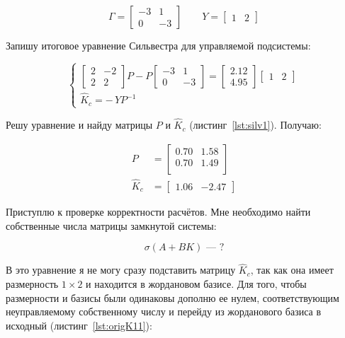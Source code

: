 \documentclass[a4paper,12pt]{article}
\begin{document}
	\[
	\Gamma =
	\begin{bmatrix}
		-3 & 1 \\
		0 & -3
	\end{bmatrix}
	\qquad
	Y =
	\begin{bmatrix}
		1 & 2
	\end{bmatrix}
	\]
	
	Запишу итоговое уравнение Сильвестра для управляемой подсистемы:
	
	\[
	\begin{cases}
		\begin{bmatrix}
			2 & -2 \\
			2 & 2
		\end{bmatrix}
		P
		-
		P
		\begin{bmatrix}
			-3 & 1 \\
			0 & -3
		\end{bmatrix}
		=
		\begin{bmatrix}
			2.12 \\
			4.95
		\end{bmatrix}
		\begin{bmatrix}
			1 & 2
		\end{bmatrix} \\[12pt]
		\hat K_c = -\,Y P^{-1}
	\end{cases}
	\]
	
	
	Решу уравнение и найду матрицы \(P\) и \(\hat K_c\) (листинг~\ref{lst:silv1}). Получаю: 
	
	\[
	\begin{aligned}
		P &= \begin{bmatrix}
			0.70 & 1.58 \\
			0.70 & 1.49 \\
		\end{bmatrix} 
		\\[10pt]
		\hat K_c &= \begin{bmatrix}
			1.06 & -2.47
		\end{bmatrix}
	\end{aligned}
	\]
	
	
	Приступлю к проверке корректности расчётов. Мне необходимо найти собственные числа матрицы замкнутой системы:
	
	\[
	\sigma(A + B K) \text{ --- ?}
	\]
	
	В это уравнение я не могу сразу подставить матрицу \(\hat K_c\), так как она имеет размерность \(1 \times 2\) и находится в жордановом базисе. Для того, чтобы размерности и базисы были одинаковы дополню ее нулем, соответствующим неуправляемому собственному числу и перейду из жорданового базиса в исходный (листинг~\ref{lst:origK11}):
	
\end{document}
